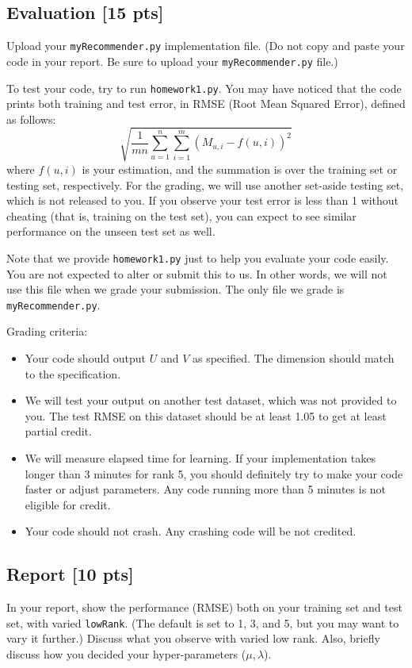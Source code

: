 \documentclass[12pt]{article}
\begin{document}
\begin{itemize}
\subsection{Evaluation [15 pts]}
Upload your \texttt{myRecommender.py} implementation file. (Do not
copy and paste your code in your report. Be sure to upload your \texttt{myRecommender.py} file.)

To test your code, try to run \texttt{homework1.py}. You may have
noticed that the code prints both training and test error, in RMSE
(Root Mean Squared Error), defined as follows:
\begin{equation}
	\sqrt{\dfrac{1}{mn}\sum_{u=1}^n\sum_{i=1}^m (M_{u,i} - f(u,i))^2} \nonumber
\end{equation}
where $f(u,i)$ is your estimation, and the summation is over the
training set or testing set, respectively. For the grading, we will
use another set-aside testing set, which is not released to you. If
you observe your test error is less than 1 without cheating (that
is, training on the test set), you can expect to see similar performance on the unseen test set as well.

Note that we provide \texttt{homework1.py} just to help you evaluate your code easily. You are not expected to alter or submit this to us. In other words, we will not use this file when we grade your submission. The only file we grade is \texttt{myRecommender.py}.

Grading criteria:
\begin{itemize}
  \item Your code should output $U$ and $V$ as specified. The dimension should match to the specification.
  \item We will test your output on another test dataset, which was not provided to you. The test RMSE on this dataset should be at least 1.05 to get at least partial credit.
  \item We will measure elapsed time for learning. If your implementation takes longer than 3 minutes for rank 5, you should definitely try to make your code faster or adjust parameters. Any code running more than 5 minutes is not eligible for credit.
  \item Your code should not crash. Any crashing code will be not credited.
\end{itemize}

\subsection{Report [10 pts]}
In your report, show the performance (RMSE) both on your training
set and test set, with varied \texttt{lowRank}. (The default is set
to 1, 3, and 5, but you may want to vary it further.) Discuss what
you observe with varied low rank. Also, briefly discuss how you
decided your hyper-parameters ($\mu, \lambda$).


\end{itemize}
\end{document}
